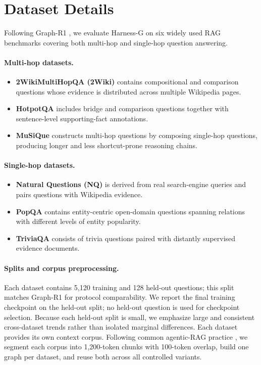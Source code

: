 \documentclass[letterpaper]{article} %
\begin{document}
\section{Dataset Details}
\label{app:data}

Following Graph-R1 \citep{luo2025graphr1}, we evaluate Harness-G on six widely used RAG benchmarks covering both multi-hop and single-hop question answering.

\paragraph{Multi-hop datasets.}
\begin{itemize}
    \item \textbf{2WikiMultiHopQA (2Wiki)} \citep{ho20202wiki} contains compositional and comparison questions whose evidence is distributed across multiple Wikipedia pages.
    \item \textbf{HotpotQA} \citep{yang2018hotpotqa} includes bridge and comparison questions together with sentence-level supporting-fact annotations.
    \item \textbf{MuSiQue} \citep{trivedi2022musique} constructs multi-hop questions by composing single-hop questions, producing longer and less shortcut-prone reasoning chains.
\end{itemize}

\paragraph{Single-hop datasets.}
\begin{itemize}
    \item \textbf{Natural Questions (NQ)} \citep{kwiatkowski2019nq} is derived from real search-engine queries and pairs questions with Wikipedia evidence.
    \item \textbf{PopQA} \citep{mallen2023popqa} contains entity-centric open-domain questions spanning relations with different levels of entity popularity.
    \item \textbf{TriviaQA} \citep{joshi2017triviaqa} consists of trivia questions paired with distantly supervised evidence documents.
\end{itemize}

\paragraph{Splits and corpus preprocessing.}
Each dataset contains 5{,}120 training and 128 held-out questions; this split matches Graph-R1 for protocol comparability.
We report the final training checkpoint on the held-out split; no held-out question is used for checkpoint selection.
Because each held-out split is small, we emphasize large and consistent cross-dataset trends rather than isolated marginal differences.
Each dataset provides its own context corpus.
Following common agentic-RAG practice \citep{jin2025searchr1}, we segment each corpus into 1{,}200-token chunks with 100-token overlap, build one graph per dataset, and reuse both across all controlled variants.
\end{document}
